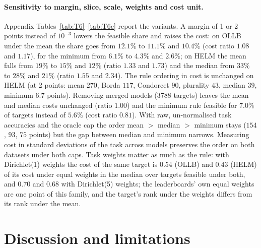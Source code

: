 \documentclass{article}
\begin{document}
\paragraph{Sensitivity to margin, slice, scale, weights and cost unit.}
Appendix Tables~\ref{tab:T6}--\ref{tab:T6c} report the variants. A margin of 1 or 2 points instead of $10^{-3}$ lowers the feasible share and raises the cost: on OLLB under the mean the share goes from $12.1\%$ to $11.1\%$ and $10.4\%$ (cost ratio $1.08$ and $1.17$), for the minimum from $6.1\%$ to $4.3\%$ and $2.6\%$; on HELM the mean falls from $19\%$ to $15\%$ and $12\%$ (ratio $1.33$ and $1.73$) and the median from $33\%$ to $28\%$ and $21\%$ (ratio $1.55$ and $2.34$). The rule ordering in cost is unchanged on HELM (at 2 points: mean $270$, Borda $117$, Condorcet $90$, plurality $43$, median $39$, minimum $6.7$ points). Removing merged models (3788 targets) leaves the mean and median costs unchanged (ratio $1.00$) and the minimum rule feasible for $7.0\%$ of targets instead of $5.6\%$ (cost ratio $0.81$). With raw, un-normalised task accuracies and the oracle cap the order mean $>$ median $>$ minimum stays ($154$, $93$, $75$ points) but the gap between median and minimum narrows. Measuring cost in standard deviations of the task across models preserves the order on both datasets under both caps. Task weights matter as much as the rule: with Dirichlet(1) weights the cost of the same target is $0.54$ (OLLB) and $0.43$ (HELM) of its cost under equal weights in the median over targets feasible under both, and $0.70$ and $0.68$ with Dirichlet(5) weights; the leaderboards' own equal weights are one point of this family, and the target's rank under the weights differs from its rank under the mean.

\section{Discussion and limitations}
\label{sec:disc}
\end{document}
